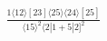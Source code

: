 \documentclass[varwidth, border=5pt]{standalone}
\begin{document}
\begin{my}
$\begin{gathered}
\scriptscriptstyle\frac{1⟨12⟩[23]⟨25⟩⟨24⟩[25]}{⟨15⟩^2⟨2|1+5|2]^2}
\end{gathered}$
\end{my}
\end{document}
